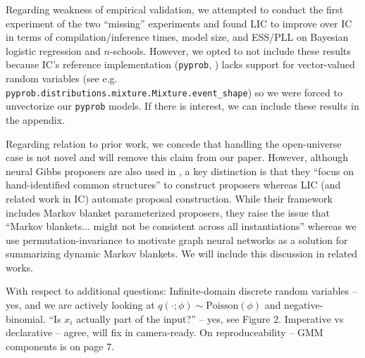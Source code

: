 \documentclass{article}
\begin{document}
Regarding weakness of empirical validation, we attempted to conduct
the first experiment of the two ``missing'' experiments
and found LIC to improve over IC \cite{le2017inference} in terms of 
compilation/inference times, model size, and ESS/PLL on Bayesian logistic
regression and $n$-schools. 
However, we opted to not include these results because IC's reference
implementation (\texttt{pyprob}, \cite{le2017inference}) lacks support for
vector-valued random variables (see e.g.
\texttt{pyprob.distributions.mixture.Mixture.event\_shape}) so we were forced
to unvectorize our \texttt{pyprob} models. If there is interest, we can
include these results in the appendix. 

Regarding relation to prior work, we concede that handling the open-universe
case is not novel and will remove this claim from our paper. However,
although neural Gibbs proposers are also used in \cite{wang2018meta}, a key
distinction is that they ``focus on hand-identified common structures'' to
construct proposers whereas LIC (and related work in IC) automate proposal
construction. While their framework includes Markov blanket parameterized
proposers, they raise the issue that ``Markov blankets... might not be
consistent across all instantiations'' whereas we use permutation-invariance
to motivate graph neural networks as a solution for summarizing dynamic
Markov blankets. We will include this discussion in related works.

With respect to additional questions:
    Infinite-domain discrete random variables -- yes, and we are
    actively looking at $q(\cdot; \phi) \sim \text{Poisson}(\phi)$ and
    negative-binomial.
    ``Is $x_i$ actually part of the input?'' -- yes, see Figure 2.
    Imperative vs declarative -- agree, will fix in camera-ready.
    On reproduceability -- GMM components is on page 7.

\end{document}
